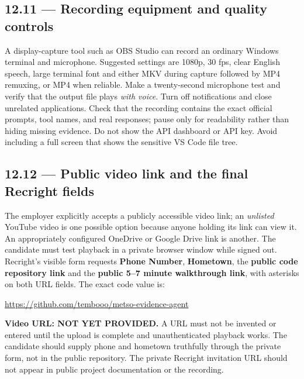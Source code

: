 \documentclass[11pt,a4paper]{article}
\begin{document}
\subsection{12.11 --- Recording equipment and quality controls}
A display-capture tool such as OBS Studio can record an ordinary Windows terminal and microphone. Suggested settings are 1080p, 30 fps, clear English speech, large terminal font and either MKV during capture followed by MP4 remuxing, or MP4 when reliable. Make a twenty-second microphone test and verify that the output file plays \emph{with voice}. Turn off notifications and close unrelated applications. Check that the recording contains the exact official prompts, tool names, and real responses; pause only for readability rather than hiding missing evidence. Do not show the API dashboard or API key. Avoid including a full screen that shows the sensitive VS Code file tree.

\subsection{12.12 --- Public video link and the final Recright fields}
The employer explicitly accepts a publicly accessible video link; an \emph{unlisted} YouTube video is one possible option because anyone holding its link can view it. An appropriately configured OneDrive or Google Drive link is another. The candidate must test playback in a private browser window while signed out. Recright's visible form requests \textbf{Phone Number}, \textbf{Hometown}, the \textbf{public code repository link} and the \textbf{public 5--7 minute walkthrough link}, with asterisks on both URL fields. The exact code value is:
\begin{keybox}
\url{https://github.com/tembooo/metso-evidence-agent}
\end{keybox}
\textbf{Video URL: NOT YET PROVIDED.} A URL must not be invented or entered until the upload is complete and unauthenticated playback works. The candidate should supply phone and hometown truthfully through the private form, not in the public repository. The private Recright invitation URL should not appear in public project documentation or the recording.
\end{document}
